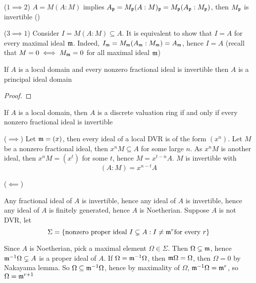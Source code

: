 \begin{longproof}
	($1 \implies 2$) 
	$ A = M (A : M)$ implies $A_\mf{p} = M_\mf{p} (A: M)_\mf{p} = M_\mf{p} (A_\mf{p}: M_\mf{p})$, then $M_\mf{p}$ is invertible () 
	
	($3 \implies 1$) Consider $I = M (A: M) \subseteq A$. It is equivalent to show that $I = A$ for every maximal ideal $\mf{m}$. Indeed, $I_\mf{m} = M_\mf{m} (A_\mf{m} : M_\mf{m}) = A_\mf{m}$, hence $I = A$ (recall that $M = 0 \iff M_\mf{m} = 0$ for all maximal ideal $\mf{m}$) 
\end{longproof}

\begin{lemma}
	If $A$ is a local domain and every nonzero fractional ideal is invertible then $A$ is a principal ideal domain
\end{lemma}

\begin{proof}
\end{proof}

\begin{proposition}
	If $A$ is a local domain, then $A$ is a discrete valuation ring if and only if every nonzero fractional ideal is invertible
\end{proposition}

\begin{longproof}
	($\implies$)
	Let $\mf{m} = (x)$, then every ideal of a local DVR is of the form $(x^n)$. Let $M$ be a nonzero fractional ideal, then $x^n M \subseteq A$ for some large $n$. As $x^n M$ is another ideal, then $x^n M = (x^t)$ for some $t$, hence $M = x^{t-n} A$. $M$ is invertible with
	$$
		(A : M) = x^{n-t} A
	$$
	
	($\impliedby$)
	
	Any fractional ideal of $A$ is invertible, hence any ideal of $A$ is invertible, hence any ideal of $A$ is finitely generated, hence $A$ is Noetherian. Suppose $A$ is not DVR, let
	$$
		\Sigma = \set*{\text{nonzero proper ideal } I \subsetneq A: I \neq \mf{m}^r \text{for every } r}
	$$
	
	Since $A$ is Noetherian, pick a maximal element $\Omega \in \Sigma$. Then $\Omega \subsetneq \mf{m}$, hence $\mf{m}^{-1} \Omega \subsetneq A$ is a proper ideal of $A$. If $\Omega = \mf{m}^{-1} \Omega$, then $\mf{m} \Omega = \Omega$, then $\Omega = 0$ by Nakayama lemma. So $\Omega \subseteq \mf{m}^{-1} \Omega$, hence by maximality of $\Omega$, $\mf{m}^{-1} \Omega = \mf{m}^r$, so $\Omega = \mf{m}^{r+1}$
\end{longproof}

